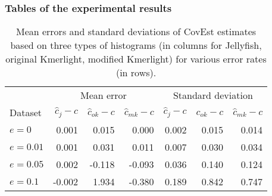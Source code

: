 


\subsubsection{Tables of the experimental results}

\begin{table}[h]
\centering
\begin{tabular}{ l || r | r | r || r | r | r }
& \multicolumn{3}{|c||}{Mean error} & \multicolumn{3}{|c}{Standard deviation}\\  
Dataset & $\hat c_j - c$ & $\hat c_{ok} - c$ & $\hat c_{mk} - c$ & $\hat c_j - c$ & $\hat c_{ok} - c$ & $\hat c_{mk} - c$ \\
\hline \hline
$e=0$ & 0.001 & 0.015 & 0.000 & 0.002 & 0.015 & 0.014\\ \hline
$e=0.01$ & 0.001 & 0.031 & 0.011 & 0.007 & 0.030 & 0.034\\ \hline
$e=0.05$ & 0.002 & -0.118 & -0.093 & 0.036 & 0.140 & 0.124\\ \hline
$e=0.1$ & -0.002 & 1.934 & -0.380 & 0.189 & 0.842 & 0.747\\
\end{tabular}
\caption[CovEst estimates for different error rates]{Mean errors and standard deviations of CovEst estimates
based on three types of histograms (in columns for Jellyfish, original Kmerlight, modified Kmerlight) for various
error rates (in rows).}
\label{tab:genome-parameters}
\end{table}

